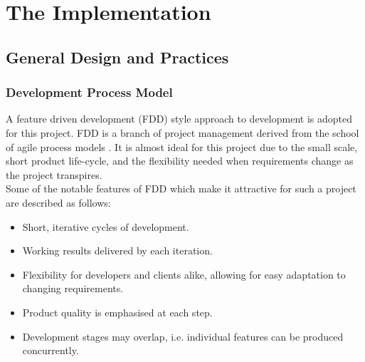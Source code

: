 \chapter{The Implementation}

\section{General Design and Practices}

\subsection*{Development Process Model}

A feature driven development (FDD) style approach to development is adopted for this project. 
FDD is a branch of project management derived from the school of agile process models \cite{pracguidefdd}. 
It is almost ideal for this project due to the small scale,  short product life-cycle,
and the flexibility needed when requirements change as the project transpires.
\\



Some of the notable features of FDD which make it attractive for such a project are described 
as follows:

\begin{itemize}
\item Short, iterative cycles of development.
\item Working results delivered by each iteration.
\item Flexibility for developers and clients alike, allowing for easy adaptation to changing requirements.
\item Product quality is emphasised at each step. 
\item Development stages may overlap, i.e. individual features can be produced concurrently.
\end{itemize}



